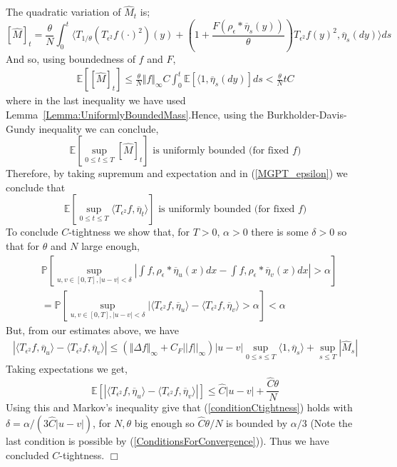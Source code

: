 \documentclass[12pt]{article}
\newenvironment {proof}{{\noindent\bf Proof }}{\hfill $\Box$ \medskip}
\newcommand{\IP}{\mathbb P}
\newcommand{\IE}{\mathbb E}
\begin{document}
\begin{proof}
The quadratic variation of $\widehat{M}_t$ is;
\[ [ \widehat{M}]_t = \frac{\theta}{N}\int_0^t \langle T_{1/\theta}(T_{\epsilon^2}f(\cdot)^2)(y) + \left(1+\frac{F(\rho_\epsilon*\overline{\eta}_s(y))}{\theta}\right)T_{\epsilon^2}f(y)^2, \overline{\eta}_s(dy) \rangle ds \]
And so, using boundedness of $f$ and $F$,
\begin{align*}
\IE\left[ [\widehat{M}]_t \right] \leq \frac{\theta}{N} \Vert f \Vert_\infty C \int_0^t \mathbb{E}\left[ \langle 1, \overline{\eta}_s(dy) \right] ds < \frac{\theta}{N} t C
\end{align*}
where in the last inequality we have used Lemma~\ref{Lemma:UniformlyBoundedMass}.Hence, using the Burkholder-Davis-Gundy inequality we can conclude,
\[ \IE[\sup_{0 \leq t \leq T} [\widehat{M}]_t ] \text{ is uniformly bounded (for fixed } f \text{)} \]
Therefore, by taking supremum and expectation and in (\ref{MGPT_epsilon}) we conclude that
\begin{equation} \IE[\sup_{0 \leq t \leq T} \langle T_{\epsilon^2} f, \overline{\eta}_t \rangle ] \text{ is uniformly bounded (for fixed } f \text{)} \label{eq:boundedIntegralAgainstf} \end{equation}
To conclude $C$-tightness we show that, for $T>0$, $\alpha > 0$ there is some $\delta >0$ so that for $\theta$ and $N$ large enough,
\begin{align}
&\IP\left[ \sup_{u,v \in [0,T], |u-v| < \delta} \left| \int f, \rho_\epsilon*\overline{\eta}_u(x) dx   - \int f, \rho_\epsilon*\overline{\eta}_v(x) dx \right|  > \alpha \right]
    \\ &=
\IP\left[ \sup_{u,v \in [0,T], |u-v| < \delta} | \langle T_{\epsilon^2} f, \overline{\eta}_u \rangle - \langle T_{\epsilon^2} f,\overline{\eta}_v \rangle > \alpha \right]
    <
    \alpha \label{conditionCtightness}
\end{align}
But, from our estimates above, we have
\begin{align*}
|\langle T_{\epsilon^2} f, \overline{\eta}_u \rangle - \langle T_{\epsilon^2} f,\overline{\eta}_v \rangle|  \leq ( \Vert \Delta f \Vert_\infty + C_F||f||_\infty) |u-v| \sup_{0 \leq s \leq T } \langle 1, \overline{\eta}_s \rangle + \sup_{s \leq T}|\widehat{M}_s|
\end{align*}
Taking expectations we get,
\begin{equation}
\IE\left[ |\langle T_{\epsilon^2} f, \overline{\eta}_u \rangle - \langle T_{\epsilon^2} f,\overline{\eta}_v \rangle|\right] \leq \widehat{C} |u-v| + \frac{\widehat{C}\theta}{N}\end{equation}
Using this and Markov's inequality give that (\ref{conditionCtightness}) holds with $\delta = \alpha/(3 \widehat{C}|u-v|)$, for $N,\theta$ big enough so $\widehat{C}\theta/N$ is bounded by $\alpha/3$ (Note the last condition is possible by (\ref{ConditionsForConvergence})). Thus we have concluded $C$-tightness. 
\end{proof}
\end{document}
